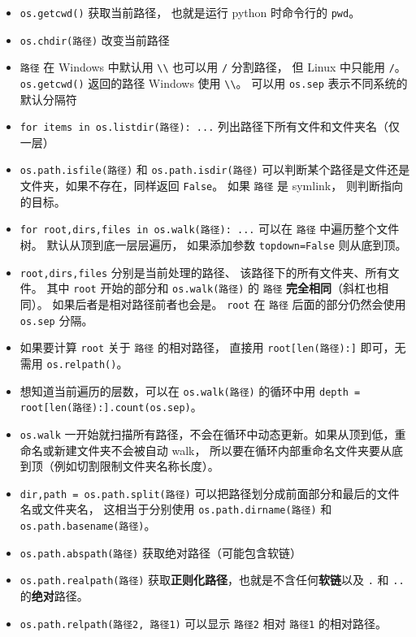
\begin{itemize}
\item \verb`os.getcwd()` 获取当前路径， 也就是运行 python 时命令行的 \verb`pwd`。
\item \verb`os.chdir(路径)` 改变当前路径 
\item \verb`路径` 在 Windows 中默认用 \verb`\\` 也可以用 \verb`/` 分割路径， 但 Linux 中只能用 \verb`/`。 \verb`os.getcwd()` 返回的路径 Windows 使用 \verb`\\`。 可以用 \verb`os.sep` 表示不同系统的默认分隔符
\item \verb`for items in os.listdir(路径): ...` 列出路径下所有文件和文件夹名（仅一层）
\item \verb`os.path.isfile(路径)` 和 \verb`os.path.isdir(路径)` 可以判断某个路径是文件还是文件夹，如果不存在，同样返回 \verb`False`。 如果 \verb`路径` 是 symlink， 则判断指向的目标。
\item \verb`for root,dirs,files in os.walk(路径): ...` 可以在 \verb`路径` 中遍历整个文件树。 默认从顶到底一层层遍历， 如果添加参数 \verb`topdown=False` 则从底到顶。
\item \verb`root,dirs,files` 分别是当前处理的路径、 该路径下的所有文件夹、所有文件。 其中 \verb`root` 开始的部分和 \verb`os.walk(路径)` 的 \verb`路径` \textbf{完全相同}（斜杠也相同）。 如果后者是相对路径前者也会是。 \verb`root` 在 \verb`路径` 后面的部分仍然会使用 \verb`os.sep` 分隔。
\item 如果要计算 \verb`root` 关于 \verb`路径` 的相对路径， 直接用 \verb`root[len(路径):]` 即可，无需用 \verb`os.relpath()`。
\item 想知道当前遍历的层数，可以在 \verb`os.walk(路径)` 的循环中用 \verb`depth = root[len(路径):].count(os.sep)`。
\item \verb`os.walk` 一开始就扫描所有路径，不会在循环中动态更新。如果从顶到低，重命名或新建文件夹不会被自动 walk， 所以要在循环内部重命名文件夹要从底到顶（例如切割限制文件夹名称长度）。
\item \verb`dir,path = os.path.split(路径)` 可以把路径划分成前面部分和最后的文件名或文件夹名， 这相当于分别使用 \verb`os.path.dirname(路径)` 和 \verb`os.path.basename(路径)`。
\item \verb`os.path.abspath(路径)` 获取绝对路径（可能包含软链）
\item \verb`os.path.realpath(路径)` 获取\textbf{正则化路径}，也就是不含任何\textbf{软链}以及 \verb`.` 和 \verb`..` 的\textbf{绝对}路径。
\item \verb`os.path.relpath(路径2, 路径1)` 可以显示 \verb`路径2` 相对 \verb`路径1` 的相对路径。

\end{itemize}

